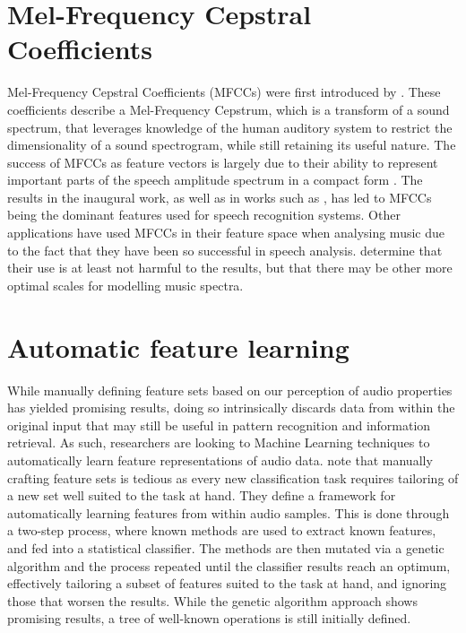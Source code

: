 \documentclass[12pt]{article}
\begin{document}
\section{Mel-Frequency Cepstral Coefficients}
Mel-Frequency Cepstral Coefficients (MFCCs) were first introduced by \citet{Davis1980MFCC}. These coefficients describe a Mel-Frequency Cepstrum, which is a transform of a sound spectrum, that leverages knowledge of the human auditory system to restrict the dimensionality of a sound spectrogram, while still retaining its useful nature. The success of MFCCs as feature vectors is largely due to their ability to represent important parts of the speech amplitude spectrum in a compact form \citep{Logan2000mel}.  The results in the inaugural work, as well as in works such as \citet{Foote1997}, has led to MFCCs being the dominant features used for speech recognition systems. Other applications have used MFCCs in their feature space when analysing music due to the fact that they have been so successful in speech analysis. \citet{Logan2000mel} determine that their use is at least not harmful to the results, but that there may be other more optimal scales for modelling music spectra.

\section{Automatic feature learning}
While manually defining feature sets based on our perception of audio properties has yielded promising results, doing so intrinsically discards data from within the original input that may still be useful in pattern recognition and information retrieval. As such, researchers are looking to Machine Learning techniques to automatically learn feature representations of audio data.  \citet{mierswa2005automatic} note that manually crafting feature sets is tedious as every new classification task requires tailoring of a new set well suited to the task at hand. They define a framework for automatically learning features from within audio samples. This is done through a two-step process, where known methods are used to extract known features, and fed into a statistical classifier. The methods are then mutated via a genetic algorithm and the process repeated until the classifier results reach an optimum, effectively tailoring a subset of features suited to the task at hand, and ignoring those that worsen the results. While the genetic algorithm approach shows promising results, a tree of well-known operations is still initially defined.
\end{document}
